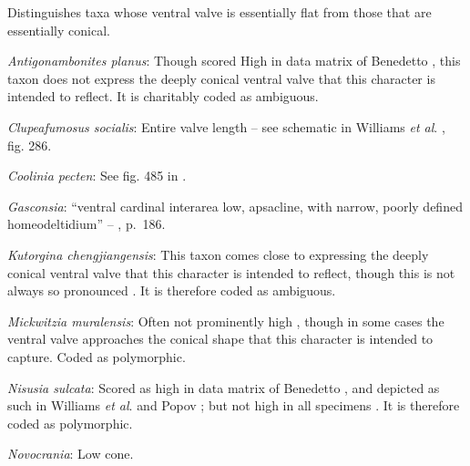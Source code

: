 \documentclass[openany]{book}
\begin{document}
Distinguishes taxa whose ventral valve is essentially flat from those
that are essentially conical.

\hypertarget{Antigonambonites_planus-coding-110}{}
\emph{Antigonambonites planus}: Though scored High in data matrix of
Benedetto \citeyearpar{Benedetto2009iChaniella}, this taxon
\citep[see][fig. 508]{Williams2000LinguliformeaCraniiformea} does not
express the deeply conical ventral valve that this character is intended
to reflect. It is charitably coded as ambiguous.

\hypertarget{Clupeafumosus_socialis-coding-110}{}
\emph{Clupeafumosus socialis}: Entire valve length -- see schematic in
Williams \emph{et al}. \citeyearpar{Williams1997Introduction}, fig. 286.

\hypertarget{Coolinia_pecten-coding-110}{}
\emph{Coolinia pecten}: See fig. 485 in
\citet{Williams2000LinguliformeaCraniiformea}.

\hypertarget{Gasconsia-coding-110}{}
\emph{Gasconsia}: ``ventral cardinal interarea low, apsacline, with
narrow, poorly defined homeodeltidium'' --
\citet{Williams2000LinguliformeaCraniiformea}, p.~186.

\hypertarget{Kutorgina_chengjiangensis-coding-110}{}
\emph{Kutorgina chengjiangensis}: This taxon
\citetext{\citealp[see][fig.
129]{Williams2000LinguliformeaCraniiformea}; \citealp[fig.
1]{Popov1992TheCambrian}} comes close to expressing the deeply conical
ventral valve that this character is intended to reflect, though this is
not always so pronounced \citep[e.g.][fig.
125]{Williams2000LinguliformeaCraniiformea}. It is therefore coded as
ambiguous.

\hypertarget{Mickwitzia_muralensis-coding-110}{}
\emph{Mickwitzia muralensis}: Often not prominently high
\citep{Skovsted2003EarlyCambrian, Balthasar2004Shellstructure}, though
in some cases \citep[e.g.][]{Butler2015Exceptionallypreserved} the
ventral valve approaches the conical shape that this character is
intended to capture. Coded as polymorphic.

\hypertarget{Nisusia_sulcata-coding-110}{}
\emph{Nisusia sulcata}: Scored as high in data matrix of Benedetto
\citeyearpar{Benedetto2009iChaniella}, and depicted as such in Williams
\emph{et al}. \citeyearpar[fig.
125]{Williams2000LinguliformeaCraniiformea} and Popov \citeyearpar[fig.
1]{Popov1992TheCambrian}; but not high in all specimens
\citep[e.g.][fig. 126]{Williams2000LinguliformeaCraniiformea}. It is
therefore coded as polymorphic.

\hypertarget{Novocrania-coding-110}{}
\emph{Novocrania}: Low cone.
\end{document}
